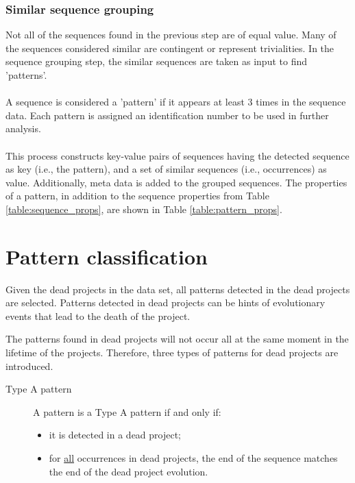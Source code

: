 

\subsubsection{Similar sequence grouping}
\label{def:pattern}
Not all of the sequences found in the previous step are of equal value. Many of
the sequences considered similar are contingent or represent trivialities. In
the sequence grouping step, the similar sequences are taken as input to find
'patterns'.

\paragraph{}
A sequence is considered a 'pattern' if it appears at least 3 times in the
sequence data. Each pattern is assigned an identification number to be used in
further analysis.

\paragraph{}
This process constructs key-value pairs of sequences having the detected
sequence as key (i.e., the pattern), and a set of similar sequences (i.e.,
occurrences) as value. Additionally, meta data is added to the grouped
sequences. The properties of a pattern, in addition to the sequence properties
from Table \ref{table:sequence_props}, are shown in Table
\ref{table:pattern_props}.



\section{Pattern classification}
\label{section:patterns_dead}
Given the dead projects in the data set, all patterns detected in the dead
projects are selected. Patterns detected in dead projects can be hints of
evolutionary events that lead to the death of the project.

The patterns found in dead projects will not occur all at the same moment in
the lifetime of the projects. Therefore, three types of patterns for dead
projects are introduced.

\vspace{1em}
\label{def:pattern_typea}
\begin{description}
	\item[Type A pattern]
		A pattern is a Type A pattern if and only if:
		\begin{itemize}
			\item it is detected in a dead project;
			\item for \underline{all} occurrences in dead projects, the end of the
				sequence matches the end of the dead project evolution.
		\end{itemize}
\end{description}


